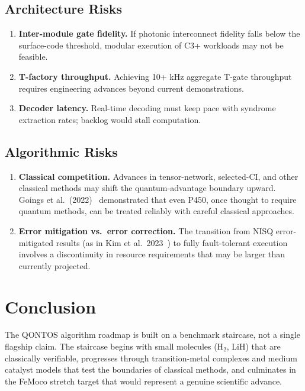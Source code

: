 \documentclass[conference]{IEEEtran}
\begin{document}
\subsection{Architecture Risks}

\begin{enumerate}[leftmargin=*]
\item \textbf{Inter-module gate fidelity.} If photonic interconnect fidelity falls below the
   surface-code threshold, modular execution of C3+ workloads may not be feasible.

\item \textbf{T-factory throughput.} Achieving 10+ kHz aggregate T-gate throughput requires
   engineering advances beyond current demonstrations.

\item \textbf{Decoder latency.} Real-time decoding must keep pace with syndrome extraction
   rates; backlog would stall computation.
\end{enumerate}

\subsection{Algorithmic Risks}

\begin{enumerate}[leftmargin=*]
\item \textbf{Classical competition.} Advances in tensor-network, selected-CI, and other
   classical methods may shift the quantum-advantage boundary upward. Goings et al.\ (2022)~\cite{goings2022} demonstrated that even P450, once thought to require quantum methods, can
   be treated reliably with careful classical approaches.

\item \textbf{Error mitigation vs.\ error correction.} The transition from NISQ error-mitigated
   results (as in Kim et al.\ 2023~\cite{kim2023}) to fully fault-tolerant execution involves a
   discontinuity in resource requirements that may be larger than currently projected.
\end{enumerate}

\section{Conclusion}

The QONTOS algorithm roadmap is built on a benchmark staircase, not a single flagship
claim. The staircase begins with small molecules (H$_2$, LiH) that are classically
verifiable, progresses through transition-metal complexes and medium catalyst models
that test the boundaries of classical methods, and culminates in the FeMoco stretch
target that would represent a genuine scientific advance.
\end{document}
